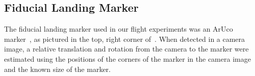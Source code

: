 
\subsection{Fiducial Landing Marker}
The fiducial landing marker used in our flight experiments was an ArUco
marker~\cite{romero2018speeded}, as pictured in the top, right corner
of~.
When detected in a camera image, a relative translation and
rotation from the camera to the marker were estimated using the positions of
the corners of the marker in the camera image and the known size of the marker. 

